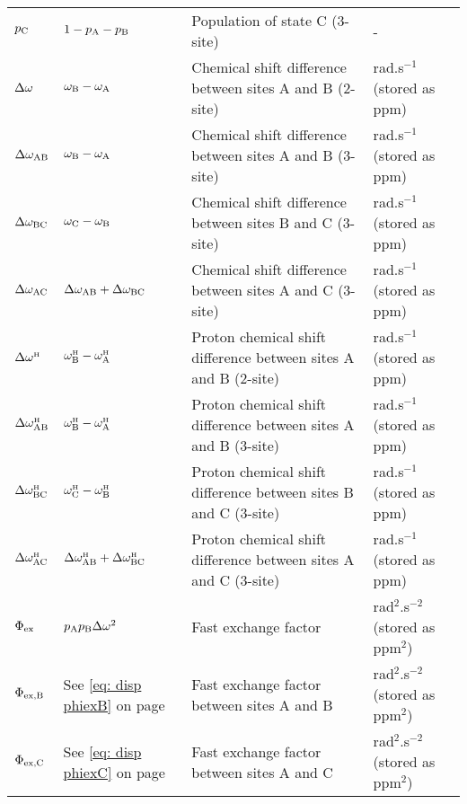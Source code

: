 \begin{center}
\begin{small}
\begin{longtable}{llll}
$p_{\textrm{C}}$              & $1-p_{\textrm{A}}-p_{\textrm{B}}$                    & Population of state C (3-site)                                                & - \\
$\Delta\omega$              & $\omega_{\textrm{B}}-\omega_{\textrm{A}}$              & Chemical shift difference between sites A and B (2-site)                      & rad.s$^{-1}$ (stored as ppm) \\
$\Delta\omega_{\textrm{AB}}$            & $\omega_{\textrm{B}}-\omega_{\textrm{A}}$              & Chemical shift difference between sites A and B (3-site)                      & rad.s$^{-1}$ (stored as ppm) \\
$\Delta\omega_{\textrm{BC}}$            & $\omega_{\textrm{C}}-\omega_{\textrm{B}}$              & Chemical shift difference between sites B and C (3-site)                      & rad.s$^{-1}$ (stored as ppm) \\
$\Delta\omega_{\textrm{AC}}$            & $\Delta\omega_{\textrm{AB}}+\Delta\omega_{\textrm{BC}}$                  & Chemical shift difference between sites A and C (3-site)                      & rad.s$^{-1}$ (stored as ppm) \\
$\Delta\omega^{\scriptscriptstyle\mathrm{H}}$             & $\omega^{\scriptscriptstyle\mathrm{H}}_{\textrm{B}}-\omega^{\scriptscriptstyle\mathrm{H}}_{\textrm{A}}$            & Proton chemical shift difference between sites A and B (2-site)               & rad.s$^{-1}$ (stored as ppm) \\
$\Delta\omega^{\scriptscriptstyle\mathrm{H}}_{\textrm{AB}}$           & $\omega^{\scriptscriptstyle\mathrm{H}}_{\textrm{B}}-\omega^{\scriptscriptstyle\mathrm{H}}_{\textrm{A}}$            & Proton chemical shift difference between sites A and B (3-site)               & rad.s$^{-1}$ (stored as ppm) \\
$\Delta\omega^{\scriptscriptstyle\mathrm{H}}_{\textrm{BC}}$           & $\omega^{\scriptscriptstyle\mathrm{H}}_{\textrm{C}}-\omega^{\scriptscriptstyle\mathrm{H}}_{\textrm{B}}$            & Proton chemical shift difference between sites B and C (3-site)               & rad.s$^{-1}$ (stored as ppm) \\
$\Delta\omega^{\scriptscriptstyle\mathrm{H}}_{\textrm{AC}}$           & $\Delta\omega^{\scriptscriptstyle\mathrm{H}}_{\textrm{AB}}+\Delta\omega^{\scriptscriptstyle\mathrm{H}}_{\textrm{BC}}$                & Proton chemical shift difference between sites A and C (3-site)               & rad.s$^{-1}$ (stored as ppm) \\
$\Phi_{\textrm{ex}}$           & $p_{\textrm{A}}p_{\textrm{B}}\Delta\omega^2$                  & Fast exchange factor                                                          & rad$^2$.s$^{-2}$ (stored as ppm$^2$) \\
$\Phi_{\textrm{ex,B}}$          & See \ref{eq: disp phiexB} on page \pageref{eq: disp phiexB} & Fast exchange factor between sites A and B       & rad$^2$.s$^{-2}$ (stored as ppm$^2$) \\
$\Phi_{\textrm{ex,C}}$          & See \ref{eq: disp phiexC} on page \pageref{eq: disp phiexC} & Fast exchange factor between sites A and C       & rad$^2$.s$^{-2}$ (stored as ppm$^2$) \\

\end{longtable}
\end{small}
\end{center}
\latex{\end{landscape}}
